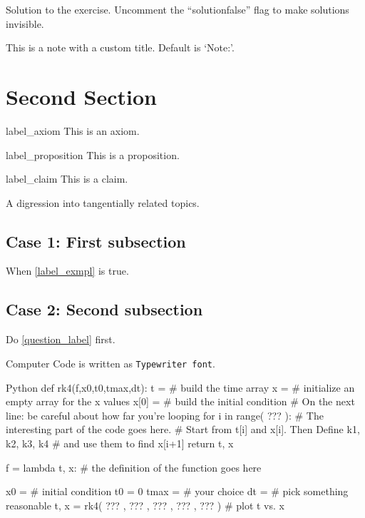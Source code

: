 \begin{solution}
	Solution to the exercise. Uncomment the ``solutionfalse'' flag to make solutions invisible.
\end{solution}


\begin{note}
	This is a note with a custom title. Default is `Note:'.
\end{note}



\section{Second Section}

\begin{axiom}{label_axiom}
	This is an axiom.
\end{axiom}

\begin{prop}{label_proposition}
	This is a proposition.
\end{prop}

\begin{claim}{label_claim}
	This is a claim.
\end{claim}

\begin{digression}
	A digression into tangentially related topics.
\end{digression}



\subsection{Case 1: First subsection}
When  \cref{label_exmpl} is true.
\begin{warning}[A Warning:] %
	\lipsum[1][1-2]
\end{warning}

\subsection{Case 2: Second subsection}
Do \cref{question_label} first.

Computer Code is written as {\tt Typewriter font}.

\begin{code}{Python}
    def rk4(f,x0,t0,tmax,dt):
        t = # build the time array
        x = # initialize an empty array for the x values
        x[0] = # build the initial condition
        # On the next line: be careful about how far you're looping
        for i in range( ??? ):
        # The interesting part of the code goes here.
        # Start from t[i] and x[i]. Then Define k1, k2, k3, k4 
        # and use them to find x[i+1]
        return t, x
        
    f = lambda t, x: # the definition of the function goes here
    
    x0 = # initial condition
    t0 = 0
    tmax = # your choice
    dt = # pick something reasonable
    t, x = rk4( ??? , ??? , ??? , ??? , ??? )
    # plot t vs. x
\end{code}
